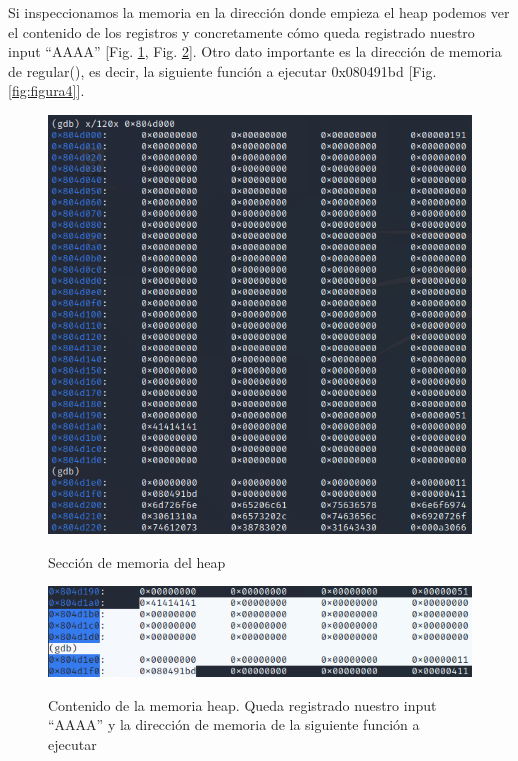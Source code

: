 \documentclass[10pt,a4paper]{article}
\begin{document}
Si inspeccionamos la memoria en la dirección donde empieza el heap podemos ver el contenido de los registros y concretamente cómo queda registrado nuestro input ``AAAA'' [Fig. \ref{fig:figura2}, Fig. \ref{fig:figura3}]. Otro dato importante es la dirección de memoria de regular(), es decir, la siguiente función a ejecutar 0x080491bd [Fig. \ref{fig:figura4}].
\begin{figure}[h!]
  \centering
  \includegraphics[scale=0.5]{2.png}\\
  \caption{Sección de memoria del heap}
  \label{fig:figura2}
\end{figure}

\begin{figure}[h!]
  \centering
  \includegraphics[scale=0.5]{2.1.png}\\
  \caption{Contenido de la memoria heap. Queda registrado nuestro input ``AAAA'' y la dirección de memoria de la siguiente función a ejecutar}
  \label{fig:figura3}
\end{figure}
\end{document}
